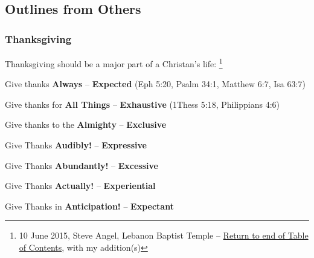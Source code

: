 \subsection{Outlines from Others}

\subsubsection{Thanksgiving}
Thanksgiving should be a major part of a Christan's life: \footnote{10 June 2015, Steve Angel, Lebanon Baptist Temple -- \textcolor[rgb]{0.00,0.25,0.00}{\hyperlink{EphesiansTOC}{Return to end of Table of Contents}}, \textcolor[rgb]{0.00,0.00,1.00}{with my addition(s)}}
\begin{compactenum}[I.]
	\item Give thanks \textbf{Always}  -- 
    \textcolor[rgb]{0.00,0.00,1.00}{\textbf{Expected}} (Eph 5:20, Psalm 34:1, Matthew 6:7,  Isa 63:7)
	\item Give thanks for \textbf{All Things} -- \textcolor[rgb]{0.00,0.00,1.00}{\textbf{Exhaustive}} (1Thess 5:18, Philippians 4:6)
	\item Give thanks to the \textbf{Almighty} -- \textcolor[rgb]{0.00,0.00,1.00}{\textbf{Exclusive}}
    \item \textcolor[rgb]{0.00,0.00,1.00}{Give Thanks \textbf{Audibly!}} -- \textcolor[rgb]{0.00,0.00,1.00}{\textbf{Expressive}}
    \item \textcolor[rgb]{0.00,0.00,1.00}{Give Thanks \textbf{Abundantly!}} -- \textcolor[rgb]{0.00,0.00,1.00}{\textbf{Excessive}}
    \item \textcolor[rgb]{0.00,0.00,1.00}{Give Thanks \textbf{Actually!}} -- 
    \textcolor[rgb]{0.00,0.00,1.00}{\textbf{Experiential}}
    \item \textcolor[rgb]{0.00,0.00,1.00}{Give Thanks in \textbf{Anticipation!}} -- 
    \textcolor[rgb]{0.00,0.00,1.00}{\textbf{Expectant}}
\end{compactenum}

